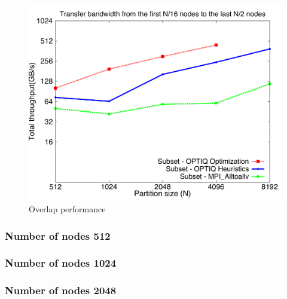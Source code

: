 \documentclass[letter]{article}
\begin{document}
\begin{figure}[h]
\vspace{-0.1in}
\centering
\includegraphics[scale=0.40]{report_figures/constantr_27.pdf}
\vspace{-0.1in}
\caption{Overlap performance}
\vspace{-0.1in}
\label{fig:patterns}
\end{figure}

\newpage

\subsubsection{Number of nodes 512}





\newpage

\subsubsection{Number of nodes 1024}





\newpage

\subsubsection{Number of nodes 2048}


\end{document}

